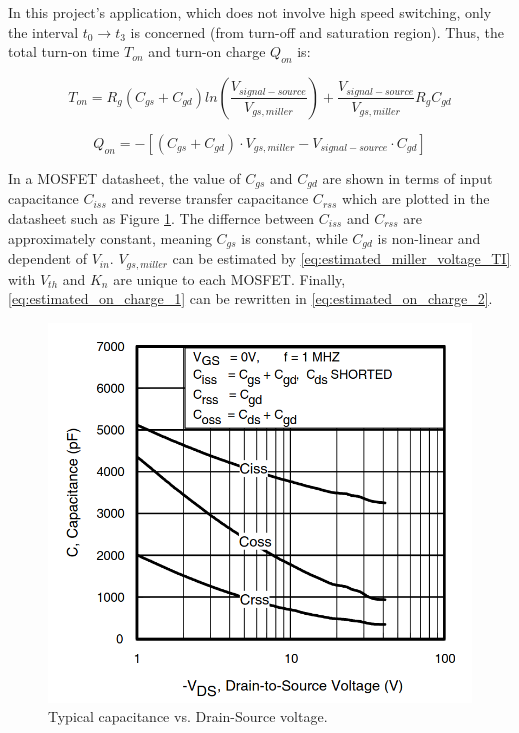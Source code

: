 \documentclass[../main.tex]{subfiles}
\begin{document}
    \justify
    In this project's application, which does not involve high speed switching, only the interval $t_0 \rightarrow t_3$ is concerned (from turn-off and saturation region). Thus, the total turn-on time $T_{on}$ and turn-on charge $Q_{on}$ is:

    \begin{equation} 
        T_{on} = R_{g}(C_{gs} +C_{gd})ln\left(\dfrac{V_{signal-source}}{V_{gs, miller}}\right) + \dfrac{V_{signal-source}}{V_{gs,miller}}R_{g}C_{gd}
    \end{equation}

    \begin{equation} \label{eq:estimated_on_charge_1}
        Q_{on} = -[(C_{gs} +C_{gd})\cdot V_{gs, miller} - V_{signal-source}\cdot C_{gd}]
    \end{equation}

    \justify
    In a MOSFET datasheet, the value of $C_{gs}$ and $C_{gd}$ are shown in terms of input capacitance $C_{iss}$ and reverse transfer capacitance $C_{rss}$ which are plotted in the datasheet such as Figure \ref{fig:typical_capacitance_plot}. The differnce between $C_{iss}$ and $C_{rss}$ are approximately constant, meaning $C_{gs}$ is constant, while $C_{gd}$ is non-linear and dependent of $V_{in}$. $V_{gs,miller}$ can be estimated by \eqref{eq:estimated_miller_voltage_TI} with $V_{th}$ and $K_n$ are unique to each MOSFET. Finally, \eqref{eq:estimated_on_charge_1} can be rewritten in \eqref{eq:estimated_on_charge_2}.

    \begin{figure}[!h]
        \centerline{\includegraphics[scale=0.25]{media/typical_capacitance_plot.png}}
        \caption{Typical capacitance vs. Drain-Source voltage.}
        \label{fig:typical_capacitance_plot}
    \end{figure}
\end{document}

